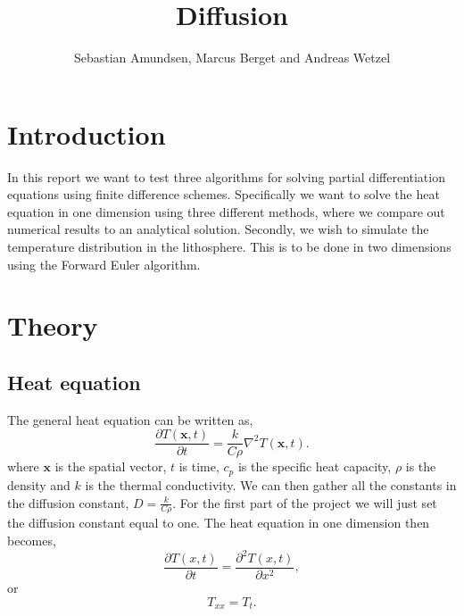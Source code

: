 \documentclass{article}
\begin{document}
\title{Diffusion}
\author{Sebastian Amundsen, Marcus Berget and Andreas Wetzel}

\maketitle

\begin{abstract}

\end{abstract}

\begin{multicols}{2}

\section{Introduction}

In this report we want to test three algorithms for solving partial differentiation equations using finite difference schemes. Specifically we want to solve the heat equation in one dimension using three different methods, where we compare out numerical results to an analytical solution. Secondly, we wish to simulate the temperature distribution in the lithosphere. This is to be done in two dimensions using the Forward Euler algorithm. 

\section{Theory}

\subsection{Heat equation}

The general heat equation can be written as,
\begin{equation}
	\frac{\partial T(\textbf{x}, t)}{\partial t} = \frac{k}{C\rho}\nabla^2 T(\textbf{x}, t). \label{eq:gen_heat}
\end{equation}
where $\textbf{x}$ is the spatial vector, $t$ is time, $c_p$ is the specific heat capacity, $\rho$ is the density and $k$ is the thermal conductivity. We can then gather all the constants in the diffusion constant, $D=\frac{k}{C\rho}$. For the first part of the project we will just set the diffusion constant equal to one. The heat equation in one dimension then becomes, 
\begin{equation}
	\frac{\partial T(x,t)}{\partial t} = \frac{\partial^2 T(x,t)}{\partial x^2}, \label{eq:heat_one}
\end{equation}
or 
\begin{equation}
	T_{xx}=T_t.
\end{equation}

\end{multicols}
\end{document}
